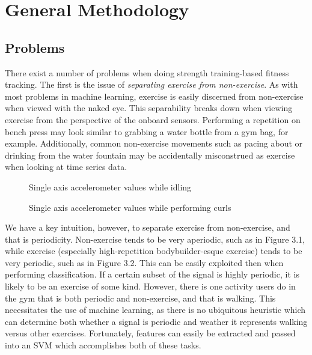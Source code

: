 \chapter{General Methodology}

\section{Problems}

There exist a number of problems when doing strength training-based fitness tracking. The first is the issue of \textit{separating exercise from non-exercise}. As with most problems in machine learning, exercise is easily discerned from non-exercise when viewed with the naked eye. This separability breaks down when viewing exercise from the perspective of the onboard sensors. Performing a repetition on bench press may look similar to grabbing a water bottle from a gym bag, for example. Additionally, common non-exercise movements such as pacing about or drinking from the water fountain may be accidentally misconstrued as exercise when looking at time series data. 

\begin{figure}
    \centering
    \caption{Single axis accelerometer values while idling}
\end{figure}

\begin{figure}
    \centering
    \caption{Single axis accelerometer values while performing curls}
\end{figure}

We have a key intuition, however, to separate exercise from non-exercise, and that is periodicity. Non-exercise tends to be very aperiodic, such as in Figure 3.1, while exercise (especially high-repetition bodybuilder-esque exercise) tends to be very periodic, such as in Figure 3.2. This can be easily exploited then when performing classification. If a certain subset of the signal is highly periodic, it is likely to be an exercise of some kind. However, there is one activity users do in the gym that is both periodic and non-exercise, and that is walking. This necessitates the use of machine learning, as there is no ubiquitous heuristic which can determine both whether a signal is periodic and weather it represents walking versus other exercises. Fortunately, features can easily be extracted and passed into an SVM which accomplishes both of these tasks.

